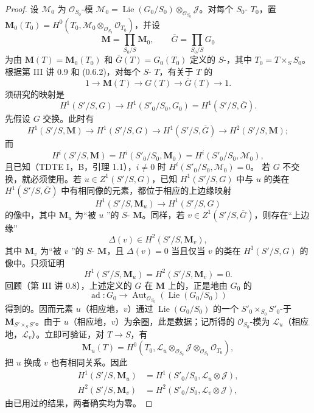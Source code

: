 \begin{proof}
设 $\mathscr M_0$ 为 $\mathscr O_{S_0}$-模 $\mathscr M_0=\operatorname{Lie}(G_0/S_0)\otimes_{\mathscr O_{S_0}}\mathscr J$。对每个 $S_0$- $T_0$，置 $\mathbf M_0(T_0)=H^0(T_0,\mathscr M_0\otimes_{\mathscr O_{S_0}}\mathscr O_{T_0})$，并设
\[\mathbf M=\prod_{S_0/S}\mathbf M_0,\qquad\overline G=\prod_{S_0/S}G_0\]
为由 $\mathbf M(T)=\mathbf M_0(T_0)$ 和 $\overline G(T)=G_0(T_0)$ 定义的 $S$-，其中 $T_0=T\times_SS_0$。根据第 III 讲 0.9 和 (0.6.2)，对每个 $S$- $T$，有关于 $T$ 的
\[1\longrightarrow\mathbf M(T)\longrightarrow G(T)\longrightarrow\overline G(T)\longrightarrow1.\]
须研究的映射是
\[H^1(S'/S,G)\longrightarrow H^1(S'_0/S_0,G_0)=H^1(S'/S,\overline G).\]
先假设 $G$ 交换。此时有
\[H^1(S'/S,\mathbf M)\longrightarrow H^1(S'/S,G)\longrightarrow H^1(S'/S,\overline G)\longrightarrow H^2(S'/S,\mathbf M);\]
而
\[H^i(S'/S,\mathbf M)=H^i(S'_0/S_0,\mathbf M_0)=H^i(S'_0/S_0,\mathscr M_0),\]
且已知（TDTE I，B，引理 1.1），$i\ne0$ 时 $H^i(S'_0/S_0,\mathscr M_0)=0$。
若 $G$ 不交换，就必须使用。若 $u\in Z^1(S'/S,G)$，已知 $H^1(S'/S,G)$ 中与 $u$ 的类在 $H^1(S'/S,\overline G)$ 中有相同像的元素，都位于相应的上边缘映射
\[H^1(S'/S,\mathbf M_u)\longrightarrow H^1(S'/S,G)\]
的像中，其中 $\mathbf M_u$ 为“被 $u$ ”的 $S$- $\mathbf M$。同样，若 $v\in Z^1(S'/S,\overline G)$，则存在“上边缘”
\[\Delta(v)\in H^2(S'/S,\mathbf M_v),\]
其中 $\mathbf M_v$ 为“被 $v$ ”的 $S$- $\mathbf M$，且 $\Delta(v)=0$ 当且仅当 $v$ 的类在 $H^1(S'/S,G)$ 的像中。只须证明
\[H^1(S'/S,\mathbf M_u)=H^2(S'/S,\mathbf M_v)=0.\]
回顾（第 III 讲 0.8），上述定义的 $G$ 在 $\mathbf M$ 上的，正是地由 $G_0$ 的
\[\operatorname{ad}:G_0\longrightarrow\operatorname{Aut}_{\mathscr O_{S_0}}(\operatorname{Lie}(G_0/S_0))\]
得到的。因而元素 $u$（相应地，$v$）通过 $\operatorname{Lie}(G_0/S_0)$ 的一个 $S'_0\times_{S_0}S'_0$-于 $\mathbf M_{S'\times_SS'}$。由于 $u$（相应地，$v$）为余圈，此是数据；记所得的 $\mathscr O_{S_0}$-模为 $\mathscr L_u$（相应地，$\mathscr L_v$）。立即可验证，对 $T\to S$，有
\[\mathbf M_u(T)=H^0(T_0,\mathscr L_u\otimes_{\mathscr O_{S_0}}\mathscr J\otimes_{\mathscr O_{S_0}}\mathscr O_{T_0}),\]
把 $u$ 换成 $v$ 也有相同关系。因此
\[\begin{aligned}
H^1(S'/S,\mathbf M_u)&=H^1(S'_0/S_0,\mathscr L_u\otimes\mathscr J),\\
H^2(S'/S,\mathbf M_v)&=H^2(S'_0/S_0,\mathscr L_v\otimes\mathscr J),
\end{aligned}\]
由已用过的结果，两者确实均为零。
\end{proof}

